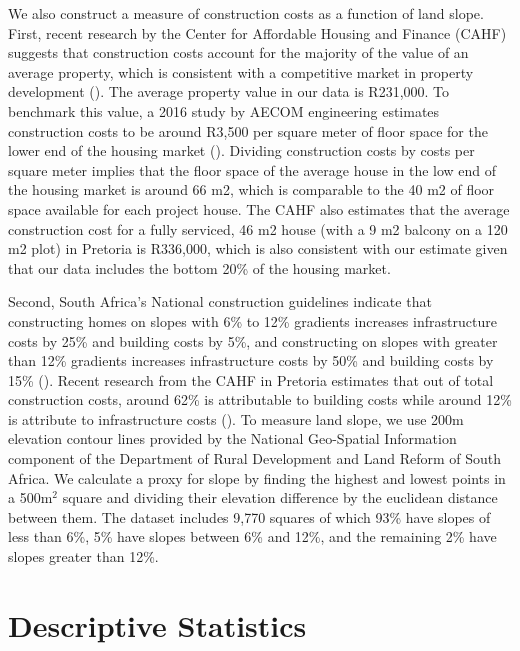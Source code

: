\documentclass[12pt]{article}
\begin{document}
We also construct a measure of construction costs as a function of land slope.  First, recent research by the Center for Affordable Housing and Finance (CAHF) suggests that construction costs account for the majority of the value of an average property, which is consistent with a competitive market in property development (\cite{cahfcosts}).  The average property value in our data is R231,000.  To benchmark this value, a 2016 study by AECOM engineering estimates construction costs to be around R3,500 per square meter of floor space for the lower end of the housing market (\cite{aecom}).  Dividing construction costs by costs per square meter implies that the floor space of the average house in the low end of the housing market is around 66 m2, which is comparable to the 40 m2 of floor space available for each project house.  The CAHF also estimates that the average construction cost for a fully serviced, 46 m2 house (with a 9 m2 balcony on a 120 m2 plot) in Pretoria is R336,000, which is also consistent with our estimate given that our data includes the bottom 20\% of the housing market.

Second, South Africa's National construction guidelines indicate that constructing homes on slopes with 6\% to 12\% gradients increases infrastructure costs by 25\% and building costs by 5\%, and constructing on slopes with greater than 12\% gradients increases infrastructure costs by 50\% and building costs by 15\% (\cite{redbook}).  Recent research from the CAHF in Pretoria estimates that out of total construction costs, around 62\% is attributable to building costs while around 12\% is attribute to infrastructure costs (\cite{cahfcosts}).  To measure land slope, we use 200m elevation contour lines provided by the National Geo-Spatial Information component of the Department of Rural Development and Land Reform of South Africa.  We calculate a proxy for slope by finding the highest and lowest points in a 500$\text{m}^{2}$ square and dividing their elevation difference by the euclidean distance between them.  The dataset includes 9,770 squares of which 93\% have slopes of less than 6\%, 5\% have slopes between 6\% and 12\%, and the remaining 2\% have slopes greater than 12\%.


\section{Descriptive Statistics}\label{section:descriptives}
\end{document}
